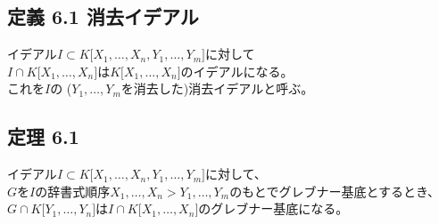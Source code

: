\documentclass[12pt,a4paper]{article}
\begin{document}
\subsection*{定義 6.1 消去イデアル}
  イデアル$I \subset K \lbrack X_1, \ldots ,X_n, Y_1, \ldots, Y_m \rbrack$に対して \\
  $I \cap K \lbrack X_1,\ldots,X_n \rbrack$は$K\lbrack X_1,\ldots,X_n \rbrack$のイデアルになる。 \\
  これを$I$の ($Y_1,\ldots,Y_m$を消去した)消去イデアルと呼ぶ。

\subsection*{定理 6.1}
  イデアル$I \subset K \lbrack X_1, \ldots, X_n, Y_1, \ldots , Y_m \rbrack$に対して、 \\
  $G$を$I$の辞書式順序$X_1,\ldots,X_n > Y_1,\ldots,Y_m$のもとでグレブナー基底とするとき、 \\
  $G \cap K \lbrack Y_1, \ldots, Y_n \rbrack$は$I\cap K \lbrack X_1, \ldots, X_n \rbrack$のグレブナー基底になる。
  
\end{document}
